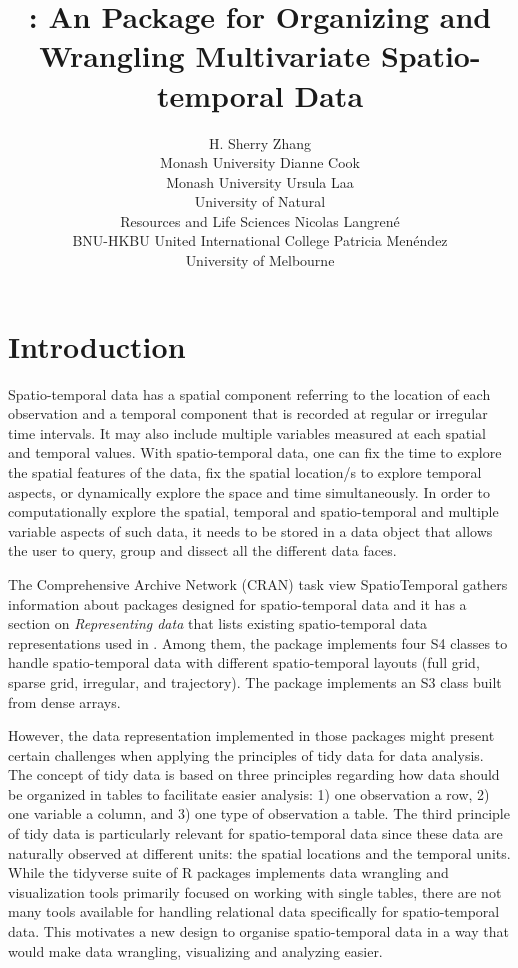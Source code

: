 \documentclass[
  shortnames]{jss}
\author{
H. Sherry Zhang\\Monash University \And Dianne Cook\\Monash University \And Ursula Laa\\University of Natural \\ Resources and Life Sciences \AND Nicolas Langrené\\BNU-HKBU United International College \And Patricia Menéndez\\University of Melbourne
}
\title{\pkg{cubble}: An \proglang{R} Package for Organizing and Wrangling Multivariate Spatio-temporal Data}
\begin{document}
\hypertarget{introduction}{%
\section{Introduction}\label{introduction}}

Spatio-temporal data \citep{bivand2008applied, lovelace2019geocomputation, pebesma2019spatial} has a spatial component referring to the location of each observation and a temporal component that is recorded at regular or irregular time intervals. It may also include multiple variables measured at each spatial and temporal values. With spatio-temporal data, one can fix the time to explore the spatial features of the data, fix the spatial location/s to explore temporal aspects, or dynamically explore the space and time simultaneously. In order to computationally explore the spatial, temporal and spatio-temporal and multiple variable aspects of such data, it needs to be stored in a data object that allows the user to query, group and dissect all the different data faces.

The Comprehensive  Archive Network (CRAN) task view SpatioTemporal \citep{ctvspatiotemporal} gathers information about  packages designed for spatio-temporal data and it has a section on \emph{Representing data} that lists existing spatio-temporal data representations used in . Among them, the  package \citep{spacetime} implements four S4 classes to handle spatio-temporal data with different spatio-temporal layouts (full grid, sparse grid, irregular, and trajectory). The  package \citep{stars} implements an S3 class built from dense arrays.

However, the data representation implemented in those packages might present certain challenges when applying the principles of tidy data \citep{tidydata} for data analysis. The concept of tidy data is based on three principles regarding how data should be organized in tables to facilitate easier analysis: 1) one observation a row, 2) one variable a column, and 3) one type of observation a table. The third principle of tidy data is particularly relevant for spatio-temporal data since these data are naturally observed at different units: the spatial locations and the temporal units. While the tidyverse suite of R packages implements data wrangling and visualization tools primarily focused on working with single tables, there are not many tools available for handling relational data specifically for spatio-temporal data. This motivates a new design to organise spatio-temporal data in a way that would make data wrangling, visualizing and analyzing easier.
\end{document}
